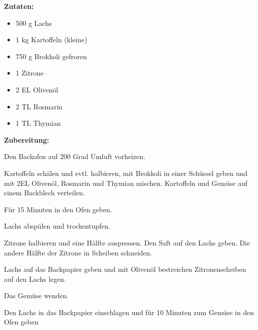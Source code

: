 \textbf {Zutaten:} \\
\begin{itemize}
	\item 500 g Lachs
	\item 1 kg Kartoffeln (kleine)
	\item 750 g Brokkoli gefroren
	\item 1 Zitrone
	\item 2 EL Olivenöl
	\item 2 TL Rosmarin
	\item 1 TL Thymian
\end{itemize}

\vspace* {2cm}

\textbf {Zubereitung:} \\
\begin{compactenum}
	\item Den Backofen auf 200 Grad Umluft vorheizen.
	\item Kartoffeln schälen und evtl. halbieren,
	mit Brokkoli in einer Schüssel geben und mit 2EL Olivenöl, Rosmarin und Thymian mischen.
	Kartoffeln und Gemüse auf einem Backblech verteilen.
	\item Für 15 Minuten in den Ofen geben.
	\item Lachs abspülen und trockentupfen.
	\item Zitrone halbieren und eine Hälfte auspressen. 
	Den Saft auf den Lachs geben.
	Die andere Hälfte der Zitrone in Scheiben schneiden.
	\item Lachs auf das Backpapier geben und mit Olivenöl bestreichen
	Zitronenscheiben auf den Lachs legen.
	\item Das Gemüse wenden. 
	\item Den Lachs in das Backpapier einschlagen und für 10 Minuten zum Gemüse in den Ofen geben 
\end{compactenum}

